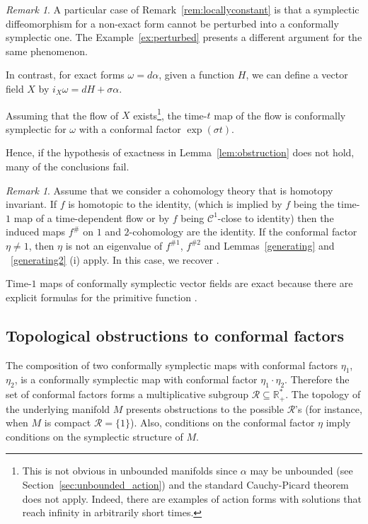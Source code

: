 \documentclass[11pt]{amsart}
\theoremstyle{definition}
\theoremstyle{remark}
\newtheorem{rem}[thm]{Remark}
\numberwithin{equation}{section}
\newcommand{\R}{\mathbb R}
\newcommand{\C}{\mathcal{C}}
\begin{document}
\begin{rem}
  A particular case of Remark~\ref{rem:locallyconstant}
  is that %
  a symplectic diffeomorphism  for a non-exact form cannot be perturbed into a conformally symplectic one.
  The Example~\ref{ex:perturbed} presents a different argument  for the same
  phenomenon.

  In contrast, for exact forms
  $\omega = d\alpha$,
  given a function $H$,
  we can define a vector field  $X$ by
  $i_X\omega = d H + \sigma \alpha$.

  Assuming that the flow of $X$ exists\footnote{This is not obvious in unbounded manifolds since $\alpha$ may be unbounded (see Section~\ref{sec:unbounded_action}) and the standard Cauchy-Picard theorem
  does not apply. Indeed, there are
  examples of action forms with solutions that reach infinity
  in arbitrarily short times.},  the time-$t$ map of the flow   is conformally symplectic for $\omega$
  with a conformal factor $ \exp(\sigma t)$.

  Hence, if the hypothesis of exactness in Lemma~\ref{lem:obstruction}
  does not hold, many of the conclusions fail.
\end{rem}







\begin{rem} \label{rem:homotopic}
Assume that we consider a  cohomology theory that is homotopy invariant.
If $f$ is homotopic to the identity, (which is implied by $f$ being
the time-$1$ map of a time-dependent
flow or by  $f$  being  $\C^1$-close to identity)
then  the induced maps $f^\#$ on $1$ and $2$-cohomology are the identity.
If the conformal factor $\eta\neq 1$,
then $\eta$ is not an eigenvalue of $f^{\#1}$, $f^{\#2}$ and
Lemmas~\ref{generating} and  ~\ref{generating2} (i) apply.
In this case,  we recover \cite[Proposition 9] {ArnaudF24}.


Time-$1$ maps of conformally symplectic vector fields are exact because
there are explicit formulas for the primitive function  \cite{ArnaudF24}.
\end{rem}



\subsection{Topological obstructions to conformal factors}
\label{sec:ArnaudF}
The composition of two conformally symplectic maps with conformal factors $\eta_1$, $\eta_2$, is a conformally symplectic map  with conformal factor  $\eta_1\cdot\eta_2$. Therefore the set of conformal factors forms a multiplicative subgroup $\mathcal{R} \subseteq {\R}_+^*$. The topology of the underlying manifold $M$
presents obstructions to the possible $\mathcal{R}$'s (for instance,  when $M$ is compact $\mathcal{R}=\{1\}$).
Also, conditions on the conformal factor $\eta$ imply conditions on the symplectic structure of $M$.
\end{document}

